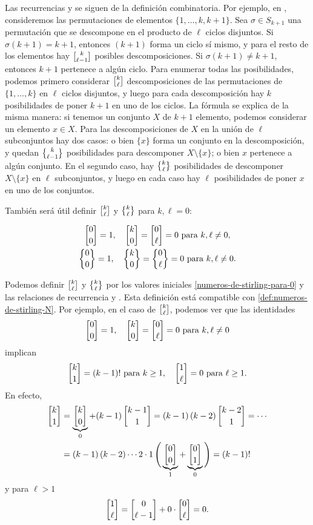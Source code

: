 \documentclass{article}
\numberwithin{equation}{section}
\theoremstyle{definition}
\begin{document}
Las recurrencias  y 
se siguen de la definición combinatoria.
Por ejemplo, en , consideremos las permutaciones
de elementos $\{ 1, \ldots, k, k+1 \}$. Sea $\sigma \in S_{k+1}$ una permutación
que se descompone en el producto de $\ell$ ciclos disjuntos. Si
$\sigma (k+1) = k+1$, entonces $(k+1)$ forma un ciclo sí mismo, y para el resto
de los elementos hay $\stirling{k}{\ell-1}$ posibles descomposiciones.
Si $\sigma (k+1) \ne k+1$, entonces $k+1$ pertenece a algún ciclo. Para enumerar
todas las posibilidades, podemos primero considerar $\stirling{k}{\ell}$
descomposiciones de las permutaciones de $\{ 1,\ldots,k \}$ en $\ell$ ciclos
disjuntos, y luego para cada descomposición hay $k$ posibilidades de poner $k+1$
en uno de los ciclos. La fórmula  se explica de
la misma manera: si tenemos un conjunto $X$ de $k+1$ elemento, podemos
considerar un elemento $x\in X$. Para las descomposiciones de $X$ en la unión
de $\ell$ subconjuntos hay dos casos: o bien $\{ x \}$ forma un conjunto en
la descomposición, y quedan $\Stirling{k}{\ell-1}$ posibilidades para
descomponer $X\setminus \{ x \}$; o bien $x$ pertenece a algún conjunto.
En el segundo caso, hay $\Stirling{k}{\ell}$ posibilidades de descomponer
$X\setminus \{ x \}$ en $\ell$ subconjuntos, y luego en cada caso hay $\ell$
posibilidades de poner $x$ en uno de los conjuntos.

También será útil definir $\stirling{k}{\ell}$ y $\Stirling{k}{\ell}$ para
$k,\ell = 0$:

\begin{definicion}
  \label{numeros-de-stirling-para-0}
  \begin{gather*}
    \stirling{0}{0} = 1, \quad \stirling{k}{0} = \stirling{0}{\ell} = 0 \text{ para }k,\ell\ne 0,\\
    \Stirling{0}{0} = 1, \quad \Stirling{k}{0} = \Stirling{0}{\ell} = 0 \text{ para }k,\ell\ne 0.
  \end{gather*}
\end{definicion}

Podemos definir $\stirling{k}{\ell}$ y $\Stirling{k}{\ell}$ por los valores
iniciales \ref{numeros-de-stirling-para-0} y las relaciones de recurrencia
 y . Esta definición
está compatible con \ref{def:numeros-de-stirling-N}. Por ejemplo, en el caso de
$\stirling{k}{\ell}$, podemos ver que las identidades
$$\stirling{0}{0} = 1, \quad \stirling{k}{0} = \stirling{0}{\ell} = 0 \text{ para }k,\ell\ne 0$$
implican
$$\stirling{k}{1} = (k-1)! \text{ para }k \ge 1, \quad \stirling{1}{\ell} = 0 \text{ para }\ell \ge 1.$$
En efecto,
\begin{align*}
  \stirling{k}{1} & = \underbrace{\stirling{k}{0}}_0 + (k-1)\,\stirling{k-1}{1}
                    = (k-1)\,(k-2)\,\stirling{k-2}{1} = \cdots \\
                  & = (k-1)\,(k-2)\cdots 2\cdot 1 \, \Bigg(\underbrace{\stirling{0}{0}}_1 + \underbrace{\stirling{0}{1}}_0 \Bigg)
                    = (k-1)!
\end{align*}
y para $\ell > 1$
$$\stirling{1}{\ell} = \stirling{0}{\ell-1} + 0\cdot \stirling{0}{\ell} = 0.$$
\end{document}
